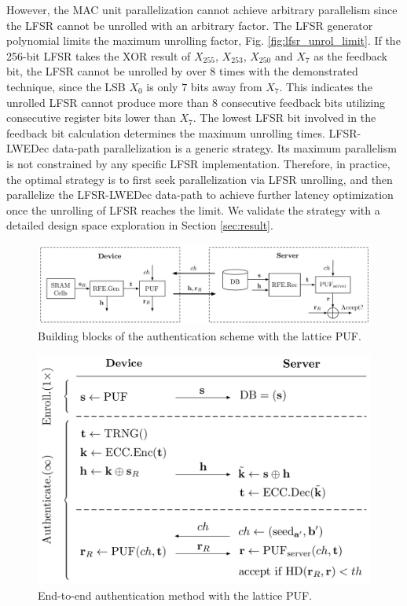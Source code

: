 However, the MAC unit parallelization cannot achieve arbitrary parallelism since the LFSR cannot be unrolled with an arbitrary factor. The LFSR generator polynomial limits the maximum unrolling factor, Fig. \ref{fig:lfsr_unrol_limit}. If the 256-bit LFSR takes the XOR result of $X_{255}$, $X_{253}$, $X_{250}$ and $X_{7}$ as the feedback bit, the LFSR cannot be unrolled by over 8 times with the demonstrated technique, since the LSB $X_{0}$ is only $7$ bits away from $X_{7}$. This indicates the unrolled LFSR cannot produce more than $8$ consecutive feedback bits utilizing consecutive register bits lower than $X_{7}$. The lowest LFSR bit involved in the feedback bit calculation determines the maximum unrolling times. LFSR-LWEDec data-path parallelization is a generic strategy. Its maximum parallelism is not constrained by any specific LFSR implementation. Therefore, in practice, the optimal strategy is to first seek parallelization via LFSR unrolling, and then parallelize the LFSR-LWEDec data-path to achieve further latency optimization once the unrolling of LFSR reaches the limit. We validate the strategy with a detailed design space exploration in Section \ref{sec:result}.

\begin{figure}[t!]
\centering
\includegraphics[width = 1.0\linewidth]{./figs/authen_system}
\caption{Building blocks of the authentication scheme with the lattice PUF.}
\label{fig:authen_system}
\end{figure}

\begin{figure}[t!]
\centering
\includegraphics[width = 0.8\linewidth]{./figs/protocol}
\caption{End-to-end authentication method with the lattice PUF.}
\label{fig:protocol}
\end{figure}

